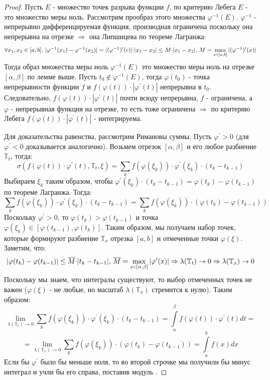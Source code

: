 \documentclass[12pt]{article}
\newcommand{\MTB}{\mathbb{T}}
\theoremstyle{definition}
\newcommand{\ddint}[2]{\displaystyle\int\limits_{#1}^{#2}}
\newcommand{\smallerrel}[1]{\mathrel{\mathpalette\smallerrelaux{#1}}}
\newcommand{\smallerrelaux}[2]{\raisebox{.1ex}{\scalebox{.75}{$#1#2$}}}
\newcommand{\smallin}{\smallerrel{\in}}
\begin{document}
\begin{proof}
	Пусть $E$ - множество точек разрыва функции $f$, по критерию Лебега $E$ - это множество меры ноль. Рассмотрим прообраз этого множества $\varphi^{-1}(E)$. $\varphi^{-1}$ - непрерывно дифференцируемая функция, производная ограничена поскольку она непрерывна на отрезке $\Rightarrow$ она Липшицева по теореме Лагранжа:
	$$
		\forall x_1, x_2 \in [a,b], \, |\varphi^{-1}(x_1) - \varphi^{-1}(x_2)| = |(\varphi^{-1})^\prime(c)|{\cdot}|x_1 - x_2| \leq M{\cdot}|x_1 - x_2|, \, M = \max\limits_{x \smallin [a,b]}|(\varphi^{-1})^\prime(x)|
	$$
	Тогда образ множества меры ноль $\varphi^{-1}(E)$ это множество меры ноль на отрезке $[\alpha,\beta]$ по лемме выше. Пусть $t_0 \notin \varphi^{-1}(E)$, тогда $\varphi(t_0)$ - точка непрерывности функции $f$ и $f\left(\varphi(t)\right){\cdot}|\varphi^\prime(t)|$ непрерывна в $t_0$.
	Следовательно, $f\left(\varphi(t)\right){\cdot}|\varphi^\prime(t)|$ почти всюду непрерывна, $f$ - ограничена, а $\varphi$ - непрерывная функция на отрезке, то есть тоже ограничена $\Rightarrow$ по критерию Лебега $f\left(\varphi(t)\right){\cdot}|\varphi^\prime(t)|$ - интегрируема.
	
	Для доказательства равенства, рассмотрим Римановы суммы. Пусть $\varphi^\prime > 0$ (для $\varphi^\prime <0$ доказывается аналогично). Возьмем отрезок $[\alpha,\beta]$ и его любое разбиение $\MTB_t$, тогда:
	$$
		\sigma(f\left(\varphi(t)\right){\cdot}\varphi^\prime(t), \MTB_t,\xi) = \sum\limits_k f\left(\varphi(\xi_k)\right){\cdot}\varphi^\prime(\xi_k){\cdot}(t_k - t_{k-1})
	$$
	Выбираем $\xi_k$ таким образом, чтобы $\varphi^\prime(\xi_k){\cdot}(t_k - t_{k-1}) = \varphi(t_k) - \varphi(t_{k-1})$ по теореме Лагранжа. Тогда:
	$$
		\sum\limits_k f\left(\varphi(\xi_k)\right){\cdot}\varphi^\prime(\xi_k){\cdot}(t_k - t_{k-1}) = \sum\limits_k f\left(\varphi(\xi_k)\right){\cdot}\left(\varphi(t_k) - \varphi(t_{k-1})\right)
	$$
	Поскольку $\varphi^\prime > 0$, то $\varphi(t_k) > \varphi(t_{k-1})$ и точка $\varphi(\xi_k) \in [\varphi(t_{k-1}), \varphi(t_k)]$. Таким образом, мы получаем набор точек, которые формируют разбиение $\MTB_x$ отрезка $[a,b]$ и отмеченные точки $\varphi(\xi)$. Заметим, что:
	$$
		|\varphi(t_k) - \varphi(t_{k-1})| \leq \overline{M}{\cdot}|t_k - t_{k-1}|, \, \overline{M} = \max\limits_{x \smallin [\alpha,\beta]}|\varphi^\prime(x)| \Rightarrow \lambda(\MTB_t) \to 0 \Rightarrow \lambda(\MTB_x) \to 0
	$$
	Поскольку мы знаем, что интегралы существуют, то выбор отмеченных точек не важен ($\varphi(\xi)$ - не любые, но масштаб $\lambda(\MTB_x)$ стремится к нулю). Таким образом:
	$$
		\lim\limits_{\lambda(\MTB_t) \to 0}\sum\limits_k f\left(\varphi(\xi_k)\right){\cdot}\varphi^\prime(\xi_k){\cdot}(t_k - t_{k-1}) = \ddint{\alpha}{\beta}f\left(\varphi(t)\right){\cdot}\varphi^\prime(t)dt	 =
	$$
	$$
		= \lim\limits_{\lambda(\MTB_x) \to 0} \sum\limits_k f\left(\varphi(\xi_k)\right){\cdot}\left(\varphi(t_k) - \varphi(t_{k-1})\right)  = \ddint{a}{b}f(x)dx
	$$
	Если бы $\varphi^\prime$ было бы меньше ноля, то во второй строчке мы получили бы минус интеграл и учли бы его справа, поставив модуль .
\end{proof}
\end{document}
